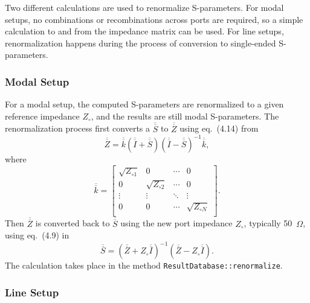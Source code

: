 \documentclass[titlepage]{article}
\renewcommand\_{\textunderscore\linebreak[1]}
\begin{document}
Two different calculations are used to renormalize S-parameters.  For modal setups, no combinations or recombinations across ports are required, so a simple calculation to and from the impedance matrix can be used.  For line setups, renormalization happens during the process of conversion to single-ended S-parameters.

\subsubsection{Modal Setup}

For a modal setup, the computed S-parameters are renormalized to a given reference impedance $Z_\circ$, and the results are still modal S-parameters.  The renormalization process first converts a $\overline{\overline{S}}$ to $\overline{\overline{Z}}$ using eq.~(4.14) from \cite{Young}
\begin{equation}
\overline{\overline{Z}}=\overline{\overline{k}}\left(\overline{\overline{I}}+\overline{\overline{S}}\right)\left(\overline{\overline{I}}-\overline{\overline{S}}\right)^{-1}\overline{\overline{k}},
\end{equation}
where
\begin{equation}
\overline{\overline{k}}=\left[
\begin{array}{cccc}
\sqrt{Z_{\circ 1}} & 0 & \cdots & 0 \\
0 & \sqrt{Z_{\circ 2}} & \cdots & 0 \\
\vdots & \vdots & \ddots & \vdots \\
0 & 0 & \cdots & \sqrt{Z_{\circ N}} \\
\end{array}
\right].
\end{equation}
Then $\overline{\overline{Z}}$ is converted back to $\overline{\overline{S}}$ using the new port impedance $Z_{\circ}$, typically 50~$\Omega$, using eq.~(4.9) in \cite{Young}
\begin{equation}
\overline{\overline{S}}=\left( \overline{\overline{Z}}+Z_{\circ}\overline{\overline{I}}\right)^{-1}\left(\overline{\overline{Z}}-Z_{\circ}\overline{\overline{I}}\right).
\end{equation}
The calculation takes place in the method \texttt{ResultDatabase::renormalize}.

\subsubsection{Line Setup}
\end{document}
